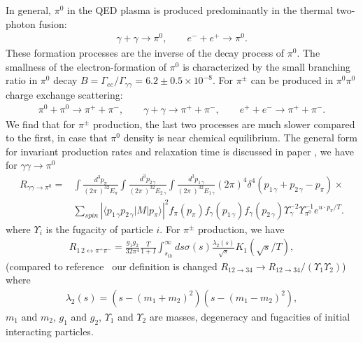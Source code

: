 \documentclass[universe,article,submit,moreauthors,pdftex,a4paper]{Definitions/mdpi}
\begin{document}
In general, $\pi^0$ in the QED plasma is produced predominantly in the thermal two-photon fusion:
\begin{align}
\gamma+\gamma \rightarrow \pi^0 ,\qquad e^-+e^+ \rightarrow \pi^0. 
\end{align}
These formation processes are the inverse of the decay process of $\pi^0$. The smallness of the electron-formation of $\pi^0$ is characterized by the small  branching ratio in $\pi^0$ decay $B=\Gamma_{ee}/\Gamma_{\gamma\gamma}=6.2\pm 0.5\times10^{-8}$.
For $\pi^{\pm}$ can be produced in $\pi^0\pi^0$ charge exchange scattering:
\begin{align}
\pi^0 + \pi^0 \rightarrow \pi^{+} + \pi^{-}, \qquad\gamma+\gamma \rightarrow \pi^{+} + \pi^{-}, \qquad
e^+ + e^- \rightarrow \pi^{+} + \pi^{-}. 
\end{align}
We find  that for $\pi^{\pm}$ production, the last two processes are much slower compared to the first, in case that $\pi^0$ density is near chemical equilibrium. The general form for invariant production rates and relaxation time is discussed in paper \cite{Kuznetsova:2008jt}, we have for $\gamma\gamma\to\pi^0$
\begin{align}
R_{\gamma\gamma\to\pi^0}=&\int\frac{d^{3}{p_{\pi}}}{(2\pi\ )^32E_{\pi}}
   \int\frac{d^{3} {p_{2\,\gamma}}}{(2\pi\ )^32E_{2\,\gamma}}
   \int\frac{d^{3}{p_{1\,\gamma}}} {(2\pi\ )^32E_{1\,\gamma} }\left(2\pi\right)^{4}
 \delta^{4}\left(p_{1\,\gamma}+p_{2\,\gamma}-p_{\pi}\right)\times \nonumber\\ &
  \sum_{spin}\left|\langle p_{1\,\gamma}p_{2\,\gamma}\left| M\right|p_{\pi}\rangle\right|^{2}
   f_{\pi}(p_{\pi})f_{\gamma}(p_{1\,\gamma})f_{\gamma}(p_{2\,\gamma})
 \Upsilon^{-2}_{\gamma}\Upsilon_{\pi^{0}}^{-1}e^{u \cdot p_{\pi}/T}. \label{pi0pr}
 \end{align}
where $\Upsilon_i$ is the fugacity of particle $i$. For $\pi^\pm$ production, we have
\begin{align}
{R_{1\,2 \leftrightarrow \pi^+\pi^-}} = \frac{g_1g_2}{32\pi^4}\frac{T}{1+I}
\int_{s_{th}}^{\infty}ds\sigma(s)\frac{\lambda_2(s)}{\sqrt{s}}K_1(\sqrt{s}/T),
\end{align}
(compared to reference~\cite{Letessier:2002gp} our definition is changed 
$R_{12\rightarrow 34} \rightarrow 
R_{12 \rightarrow 34}/(\Upsilon_1 \Upsilon_2)$)
where
\begin{align}
\lambda_2(s) = (s-(m_{1}+m_2)^2)(s-(m_1-m_2)^2),
\end{align}
$m_1$ and $m_2$, $g_1$ and $g_2$, $\Upsilon_1$ and $\Upsilon_2$ are masses, degeneracy and fugacities of initial interacting particles. 
\end{document}
